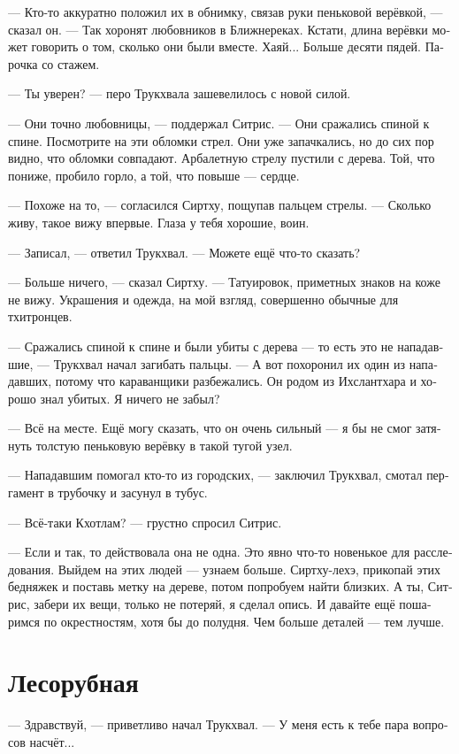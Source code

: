 \documentclass[a4paper,12pt,fleqn]{book}\usepackage{polyglossia}\setdefaultlanguage[babelshorthands=true]{russian}\setotherlanguage{english}\defaultfontfeatures{Ligatures=TeX,Mapping=tex-text}\usepackage{xcolor}\newcommand{\ml}[3]{#2}
\begin{document}
--- Кто-то аккуратно положил их в обнимку, связав руки пеньковой верёвкой, --- сказал он.
--- Так хоронят любовников в Ближнереках.
Кстати, длина верёвки может говорить о том, сколько они были вместе.
Хаяй...
Больше десяти пядей.
Парочка со стажем.

--- Ты уверен? --- перо Трукхвала зашевелилось с новой силой.

--- Они точно любовницы, --- поддержал Ситрис.
--- Они сражались спиной к спине.
Посмотрите на эти обломки стрел.
Они уже запачкались, но до сих пор видно, что обломки совпадают.
Арбалетную стрелу пустили с дерева.
Той, что пониже, пробило горло, а той, что повыше --- сердце.

--- Похоже на то, --- согласился Сиртху, пощупав пальцем стрелы.
--- Сколько живу, такое вижу впервые.
Глаза у тебя хорошие, воин.

--- Записал, --- ответил Трукхвал.
--- Можете ещё что-то сказать?

--- Больше ничего, --- сказал Сиртху.
--- Татуировок, приметных знаков на коже не вижу.
Украшения и одежда, на мой взгляд, совершенно обычные для тхитронцев.

--- Сражались спиной к спине и были убиты с дерева --- то есть это не нападавшие, --- Трукхвал начал загибать пальцы.
--- А вот похоронил их один из нападавших, потому что караванщики разбежались.
Он родом из Ихслантхара и хорошо знал убитых.
Я ничего не забыл?

--- Всё на месте.
Ещё могу сказать, что он очень сильный --- я бы не смог затянуть толстую пеньковую верёвку в такой тугой узел.

--- Нападавшим помогал кто-то из городских, --- заключил Трукхвал, смотал пергамент в трубочку и засунул в тубус.

--- Всё-таки Кхотлам? --- грустно спросил Ситрис.

--- Если и так, то действовала она не одна.
Это явно что-то новенькое для расследования.
Выйдем на этих людей --- узнаем больше.
Сиртху-лехэ, прикопай этих бедняжек и поставь метку на дереве, потом попробуем найти близких.
А ты, Ситрис, забери их вещи, только не потеряй, я сделал опись.
И давайте ещё пошаримся по окрестностям, хотя бы до полудня.
Чем больше деталей --- тем лучше.

\section{Лесорубная}

--- Здравствуй, --- приветливо начал Трукхвал.
--- У меня есть к тебе пара вопросов насчёт...
\end{document}
